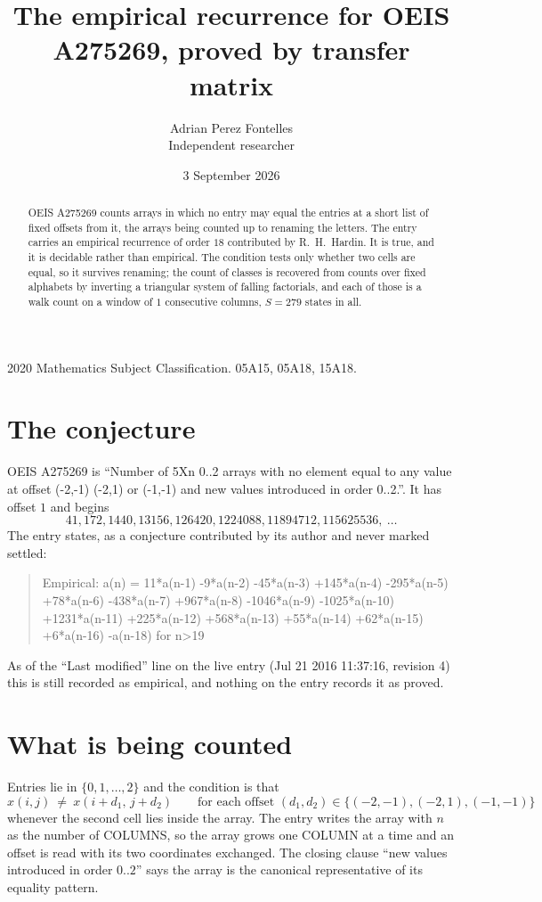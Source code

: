 \documentclass[11pt,a4paper]{article}
\title{The empirical recurrence for OEIS A275269, proved by transfer matrix}
\author{Adrian Perez Fontelles\\ \small Independent researcher}
\date{3 September 2026}
\theoremstyle{plain}
\theoremstyle{definition}
\begin{document}
\maketitle

\begin{abstract}
OEIS A275269 counts arrays in which no entry may equal the entries at a short list of fixed offsets
from it, the arrays being counted up to renaming the letters. The entry carries an empirical
recurrence of order $18$ contributed by R.~H.~Hardin. It is true, and it is decidable
rather than empirical. The condition tests only whether two cells are equal, so it survives
renaming; the count of classes is recovered from counts over fixed alphabets by inverting a
triangular system of falling factorials, and each of those is a walk count on a window of
$1$ consecutive columns, $S=279$ states in all.
\end{abstract}

\noindent\small 2020 Mathematics Subject Classification. 05A15, 05A18, 15A18.\normalsize

\section{The conjecture}

OEIS A275269 is ``Number of 5Xn 0..2 arrays with no element equal to any value at offset (-2,-1) (-2,1) or (-1,-1) and new values introduced in order 0..2.''. It has offset $1$ and begins
\[
41, 172, 1440, 13156, 126420, 1224088, 11894712, 115625536,\ \dots
\]
The entry states, as a conjecture contributed by its author and never marked settled:
\begin{quote}
Empirical: a(n) = 11*a(n-1) -9*a(n-2) -45*a(n-3) +145*a(n-4) -295*a(n-5) +78*a(n-6) -438*a(n-7) +967*a(n-8) -1046*a(n-9) -1025*a(n-10) +1231*a(n-11) +225*a(n-12) +568*a(n-13) +55*a(n-14) +62*a(n-15) +6*a(n-16) -a(n-18) for n>19
\end{quote}
As of the ``Last modified'' line on the live entry (Jul 21 2016 11:37:16, revision 4) this is still
recorded as empirical, and nothing on the entry records it as proved.

\section{What is being counted}

Entries lie in $\{0,1,\dots,2\}$ and the condition is that
\[
x(i,j)\ \ne\ x(i+d_1,\,j+d_2)\qquad\text{for each offset }(d_1,d_2)\in\{(-2,-1), (-2,1), (-1,-1)\}
\]
whenever the second cell lies inside the array. The entry writes the array with $n$ as the number of COLUMNS, so the array grows one COLUMN at a time and an offset is read with its two coordinates exchanged. The closing clause ``new values
introduced in order $0..2$'' says the array is the canonical representative of its equality
pattern.
\end{document}
